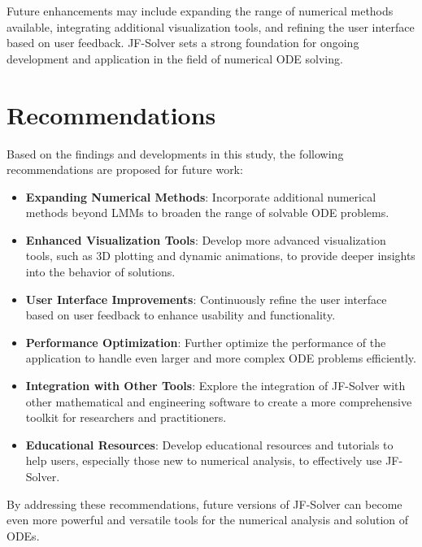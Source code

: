 Future enhancements may include expanding the range of numerical methods available, integrating additional visualization tools, and refining the user interface based on user feedback. JF-Solver sets a strong foundation for ongoing development and application in the field of numerical ODE solving.

\section{Recommendations}

Based on the findings and developments in this study, the following recommendations are proposed for future work:

\begin{itemize}
  \item \textbf{Expanding Numerical Methods}: Incorporate additional numerical methods beyond LMMs to broaden the range of solvable ODE problems.
  \item \textbf{Enhanced Visualization Tools}: Develop more advanced visualization tools, such as 3D plotting and dynamic animations, to provide deeper insights into the behavior of solutions.
  \item \textbf{User Interface Improvements}: Continuously refine the user interface based on user feedback to enhance usability and functionality.
  \item \textbf{Performance Optimization}: Further optimize the performance of the application to handle even larger and more complex ODE problems efficiently.
  \item \textbf{Integration with Other Tools}: Explore the integration of JF-Solver with other mathematical and engineering software to create a more comprehensive toolkit for researchers and practitioners.
  \item \textbf{Educational Resources}: Develop educational resources and tutorials to help users, especially those new to numerical analysis, to effectively use JF-Solver.
\end{itemize}

By addressing these recommendations, future versions of JF-Solver can become even more powerful and versatile tools for the numerical analysis and solution of ODEs.
